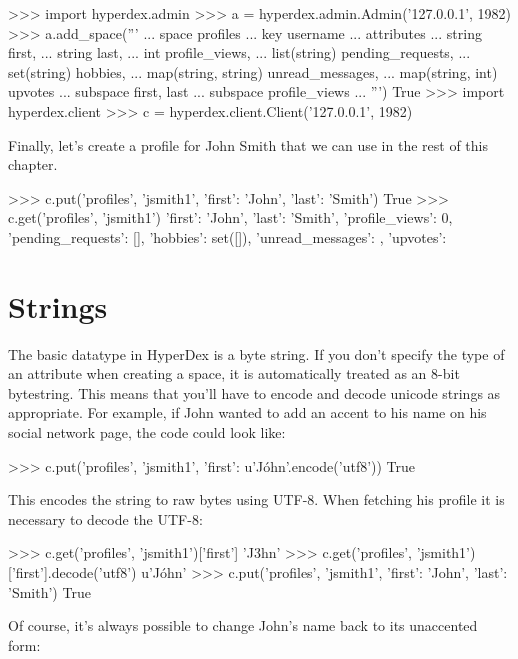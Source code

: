 \begin{pythoncode}
>>> import hyperdex.admin
>>> a = hyperdex.admin.Admin('127.0.0.1', 1982)
>>> a.add_space('''
... space profiles
... key username
... attributes
...    string first,
...    string last,
...    int profile_views,
...    list(string) pending_requests,
...    set(string) hobbies,
...    map(string, string) unread_messages,
...    map(string, int) upvotes
... subspace first, last
... subspace profile_views
... ''')
True
>>> import hyperdex.client
>>> c = hyperdex.client.Client('127.0.0.1', 1982)
\end{pythoncode}

Finally, let's create a profile for John Smith that we can use in the rest of
this chapter.

\begin{pythoncode}
>>> c.put('profiles', 'jsmith1', {'first': 'John', 'last': 'Smith'})
True
>>> c.get('profiles', 'jsmith1')
{'first': 'John', 'last': 'Smith',
 'profile_views': 0,
 'pending_requests': [],
 'hobbies': set([]),
 'unread_messages': {},
 'upvotes': {}}
\end{pythoncode}

\section{Strings}
\label{sec:data-types:strings}

The basic datatype in HyperDex is a byte string.  If you don't specify the type
of an attribute when creating a space, it is automatically treated as an 8-bit
bytestring.  This means that you'll have to encode and decode unicode strings as
appropriate.  For example, if John wanted to add an accent to his name on his
social network page, the code could look like:

\begin{pythoncode}
>>> c.put('profiles', 'jsmith1', {'first': u'Jóhn'.encode('utf8')})
True
\end{pythoncode}

This encodes the string to raw bytes using UTF-8.  When fetching his profile it
is necessary to decode the UTF-8:

\begin{pythoncode}
>>> c.get('profiles', 'jsmith1')['first']
'J\xb3hn'
>>> c.get('profiles', 'jsmith1')['first'].decode('utf8')
u'Jóhn'
>>> c.put('profiles', 'jsmith1', {'first': 'John', 'last': 'Smith'})
True
\end{pythoncode}

Of course, it's always possible to change John's name back to its unaccented
form:


